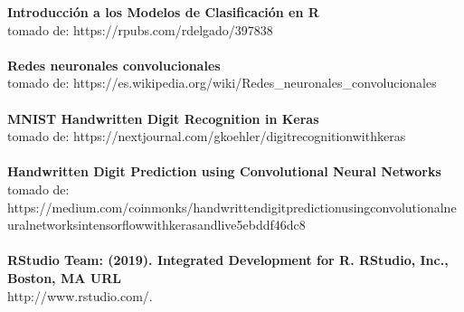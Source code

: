 \documentclass{article}
\begin{document}
\begin{description}
\textbf{Introducción a los Modelos de Clasificación en R} \\
tomado de: https://rpubs.com/rdelgado/397838 \\
\\
\textbf{Redes neuronales convolucionales} \\
tomado de: https://es.wikipedia.org/wiki/Redes\_neuronales\_convolucionales \\
\\
\textbf{MNIST Handwritten Digit Recognition in Keras}\\
tomado de: https://nextjournal.com/gkoehler/digit\-recognition\-with\-keras \\
\\
\textbf{Handwritten Digit Prediction using Convolutional Neural Networks} \\
tomado de: https://medium.com/coinmonks/handwritten\-digit\-prediction\-using\-convolutional\-neural\-networks\-in\-tensorflow\-with\-keras\-and\-live\-5ebddf46dc8 \\
\\
\textbf{RStudio Team: (2019). Integrated Development for R. RStudio, Inc., Boston, MA URL} \\
http://www.rstudio.com/.

\end{description}
\end{document}
